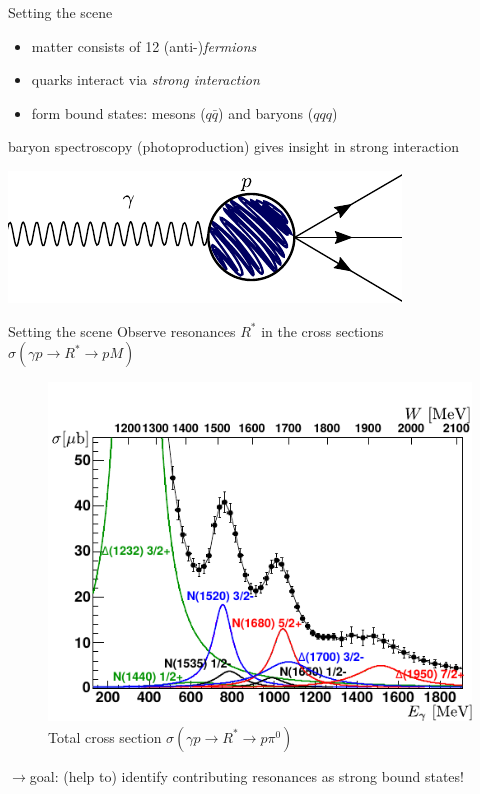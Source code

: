 \documentclass[11pt,aspectratio=169,dvipsnames]{beamer}
\newcommand{\thecolor}{black!70!blue}
\begin{document}
	\begin{frame}{Setting the scene}
		\begin{tcolorbox}[colback=blue!5,colframe=\thecolor,title=The Standard Model of Particle Physics]
			\begin{itemize}
				\item matter consists of 12 (anti-)\emph{fermions}
				\item quarks interact via \emph{strong interaction} 
				\item form bound states: mesons ($q\bar{q}$) and baryons ($qqq$)
			\end{itemize} 
		\end{tcolorbox}
	baryon spectroscopy (photoproduction) gives insight in strong interaction
	\begin{center}
			\includegraphics[width=.6\linewidth]{feynman}
	\end{center}


	
	
\end{frame}
\begin{frame}{Setting the scene}
	Observe resonances $R^*$ in the cross sections $\sigma(\gamma p \to R^* \to p M)$
	\vspace{-0.8cm}
	\begin{figure}
		\centering
		\includegraphics[width=.5\linewidth]{partialwaves}
		\caption*{Total cross section $\sigma(\gamma p \to R^*\to p \pi^0)$ }
	\end{figure}
$\to$goal: (help to) identify contributing resonances as strong bound states!\\
\end{frame}
\begin{frame}
	\tableofcontents
\end{frame}
\end{document}
